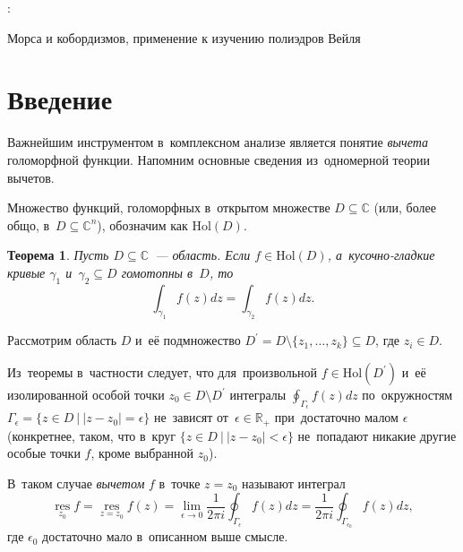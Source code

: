 \documentclass{article}
\newtheorem*{theorem*}{Теорема}
\begin{document}

\begin{titlepage}
  \centering

  {:\vspace{0.2cm}}\par
  { Морса и кобордизмов, применение к изучению полиэдров Вейля}
\end{titlepage}

\tableofcontents

\section{Введение}

Важнейшим инструментом в~комплексном анализе является понятие \textit{вычета} голоморфной функции.
Напомним основные сведения из~одномерной теории вычетов.

Множество функций, голоморфных в~открытом множестве $D \subseteq \mathbb{C}$ (или, более общо, в~$D \subseteq \mathbb{C}^n$), обозначим как $\mathrm{Hol}(D)$.

\begin{theorem*}
  Пусть $D \subseteq \mathbb{C}$~— область. Если $f \in \mathrm{Hol}(D)$, а~кусочно-гладкие кривые $\gamma_1$
  и~$\gamma_2 \subseteq D$ гомотопны в~$D$, то
  $$
    \int_{\gamma_1} f(z)dz = \int_{\gamma_2} f(z)dz.
  $$
\end{theorem*}

Рассмотрим область $D$ и~её подмножество $D^\prime = D \setminus \{ z_1, \ldots, z_k \} \subseteq D$, где $z_i \in D$.

Из~теоремы в~частности следует, что для~произвольной $f \in \mathrm{Hol}(D^\prime)$ и~её изолированной
особой точки $z_0 \in D \setminus D^\prime$ интегралы $\oint_{\Gamma_\epsilon} f(z)dz$ по~окружностям
$\Gamma_\epsilon = \{ z \in D \ | \ |z - z_0| = \epsilon \}$ не~зависят от~$\epsilon \in \mathbb{R}_{+}$
при~достаточно малом $\epsilon$ (конкретнее, таком, что в~круг $\{ z \in D \ | \ |z - z_0| < \epsilon \}$
не~попадают никакие другие особые точки $f$, кроме выбранной $z_0$).

В~таком случае \textit{вычетом} $f$ в~точке $z = z_0$ называют интеграл
$$
  \operatorname*{res}\limits_{z_0} f = \operatorname*{res}\limits_{z = z_0} f(z) = \lim\limits_{\epsilon \to 0} \frac{1}{2 \pi i} \oint_{\Gamma_\epsilon} f(z)dz = \frac{1}{2 \pi i} \oint_{\Gamma_{\epsilon_0}} f(z)dz,
$$
где $\epsilon_0$ достаточно мало в~описанном выше смысле.
\end{document}
